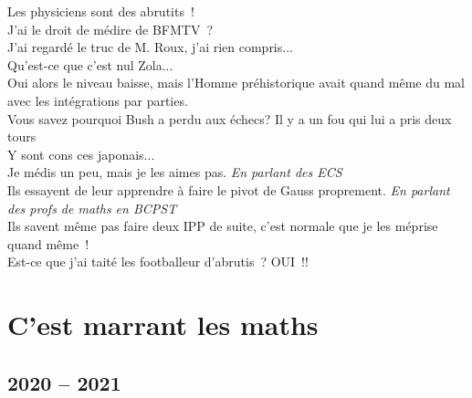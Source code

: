 \documentclass[french, a4paper, openany]{book}
\begin{document}
	\noindent \og Les physiciens sont des abrutits~! \fg \\
	\og J'ai le droit de médire de BFMTV~? \fg \\
	\og J'ai regardé le truc de M. Roux, j'ai rien compris... \fg \\
	\og Qu'est-ce que c'est nul Zola... \fg \\
	\og Oui alors le niveau baisse, mais l'Homme préhistorique avait quand même du mal avec les intégrations par parties. \fg \\
	\og Vous savez pourquoi Bush a perdu aux échecs? Il y a un fou qui lui a pris deux tours \fg \\
	\og Y sont cons ces japonais... \fg \\
	\og Je médis un peu, mais je les aimes pas. \fg \emph{En parlant des ECS}\\
	\og Ils essayent de leur apprendre à faire le pivot de Gauss proprement. \fg \emph{En parlant des profs de maths en BCPST} \\
	\og Ils savent même pas faire deux IPP de suite, c'est normale que je les méprise quand même~! \fg \\
	\og Est-ce que j'ai taité les footballeur d'abrutis~? OUI~!! \fg \\

\section*{C'est marrant les maths}

	\subsection*{2020 -- 2021}
\end{document}
